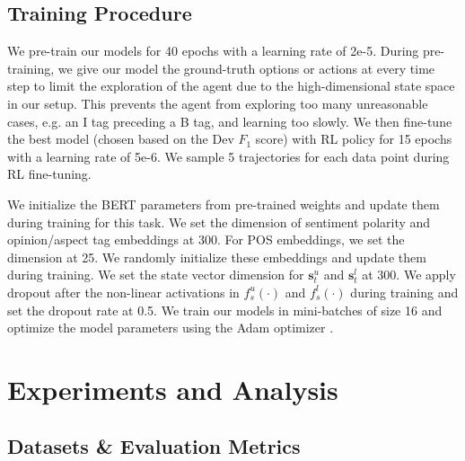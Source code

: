 \documentclass[sigconf]{acmart}
\begin{document}
\subsection{Training Procedure}

We pre-train our \mymodel{} models for 40 epochs with a learning rate of 2e-5. During pre-training, we give our model the ground-truth options or actions at every time step to limit the exploration of the agent due to the high-dimensional state space in our setup. This prevents the agent from exploring too many unreasonable cases, e.g. an I tag preceding a B tag, and learning too slowly. We then fine-tune the best model (chosen based on the Dev $F_1$ score) with RL policy for 15 epochs with a learning rate of 5e-6. We sample 5 trajectories for each data point during RL fine-tuning. 

We initialize the BERT parameters from pre-trained weights \citep{devlin2018bert} and update them during training for this task. We set the dimension of sentiment polarity and opinion/aspect tag embeddings at 300. For POS embeddings, we set the dimension at 25. We randomly initialize these embeddings and update them during training. We set the state vector dimension for $\mathrm{\textbf{s}}^u_t$ and $\mathrm{\textbf{s}}^l_t$ at 300. We apply dropout \cite{srivastava2014dropout} after the non-linear activations in $f^{u}_{s}(\cdot)$ and $f^{l}_{s}(\cdot)$ during training and set the dropout rate at 0.5. We train our models in mini-batches of size 16 and optimize the model parameters using the Adam optimizer \cite{kingma2014adam}.

\section{Experiments and Analysis}

\subsection{Datasets \& Evaluation Metrics}
\end{document}

